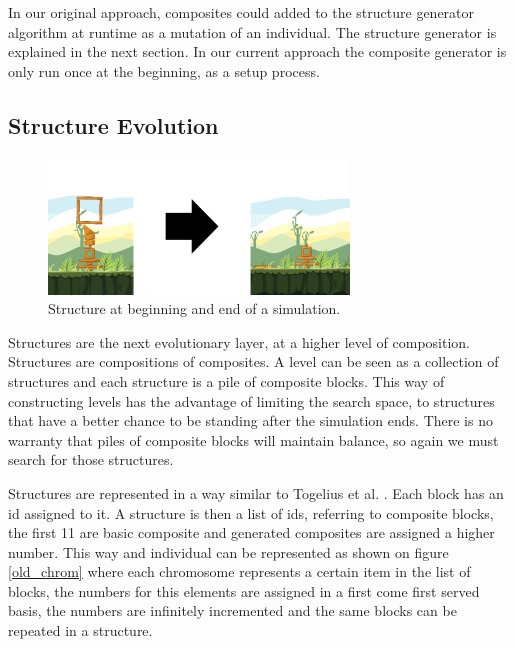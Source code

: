 \documentclass[conference]{IEEEtran}
\begin{document}
    In our original approach, composites could added to the structure generator
    algorithm at runtime as a mutation of an individual. The structure generator
    is explained in the next section.
    In our current approach the composite generator is only
    run once at the beginning, as a setup process.
    

    \subsection{Structure Evolution}
   
    \begin{figure}[htbp]
    \centerline{\includegraphics[width=80mm]{Images/simulation_bef_aft_example.png}}
    \caption{Structure at beginning and end of a simulation.}
    \label{test_old}
    \end{figure}
    
    Structures are the next evolutionary layer, at a higher level of composition.
    Structures are compositions of composites. A level can be seen as a collection 
    of structures and each structure is a pile of composite blocks. This way of 
    constructing levels has the advantage of
    limiting the search space, to structures that have a better chance to be 
    standing after the simulation ends. There is no warranty that piles of 
    composite blocks will maintain balance, so again we must search for those 
    structures.

    Structures are represented in a way similar to Togelius et al.
    \cite{togelius2016Representationsforsearch-basedmethods}. Each block has
    an id assigned to it. A structure is then a list of ids, referring to
    composite blocks, the first 11 are basic composite and generated composites 
    are assigned a higher number.  This way and individual can be
    represented as shown on figure \ref{old_chrom} where each chromosome
    represents a certain item in the list of blocks, the numbers for this
    elements are assigned in a first come first served basis, the numbers are
    infinitely incremented and the same blocks can be repeated in a structure.
    
\end{document}

